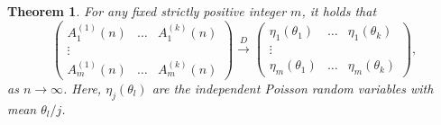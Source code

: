 \documentclass[12pt]{amsart}
\newtheorem{thm}{Theorem}[section]
\theoremstyle{definition}
\numberwithin{equation}{section}
\begin{document}
\begin{thm}\label{TheoremConvergencePoisson}
For any fixed strictly positive integer $m$, it holds that
\begin{equation}
\left(
\begin{array}{ccc}
  A_1^{(1)}(n) & \ldots & A_1^{(k)}(n) \\
  \vdots &  &  \\
  A_m^{(1)}(n) & \ldots & A_m^{(k)}(n)
\end{array}
\right)\overset{D}{\longrightarrow}
\left(\begin{array}{ccc}
  \eta_1(\theta_1) &  \ldots & \eta_1(\theta_k) \\
  \vdots &  &  \\
  \eta_m(\theta_1) & \ldots & \eta_m(\theta_k)
\end{array}
\right),
\end{equation}
as $n\rightarrow\infty$. Here, $\eta_j(\theta_l)$ are the independent Poisson random variables with mean $\theta_l/j$.
\end{thm}
\end{document}
